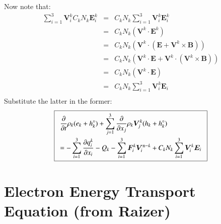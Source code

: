 \documentclass{warpdoc}
\newcommand\frameeqn[1]{\fbox{$\displaystyle #1$}}
\newcommand{\alb}{\vspace{0.1cm}\\} %
\newcommand{\mfd}{\displaystyle}
\renewcommand{\vec}[1]{\bm{#1}}
\begin{document}
%  
Now note that:
%
\begin{equation}
\begin{array}{rcl}
  \sum_{i=1}^3 \vec{V}_i^k C_k N_k \vec{E}^k_i 
     &=& C_k N_k \sum_{i=1}^3 \vec{V}_i^k \vec{E}^k_i \\
   ~ &=& C_k N_k  \left(\vec{V}^k \cdot \vec{E}^k \right) \\
   ~ &=& C_k N_k  \left(\vec{V}^k \cdot (\vec{E}+\vec{V}^k \times \vec{B}) \right)\\
   ~ &=& C_k N_k  \left(\vec{V}^k \cdot \vec{E}+ \vec{V}^k \cdot (\vec{V}^k \times \vec{B}) \right)\\
   ~ &=& C_k N_k  \left(\vec{V}^k \cdot \vec{E} \right)\\
   ~ &=& C_k N_k \sum_{i=1}^3 \vec{V}^k_i \vec{E}_i \\
\end{array}
\end{equation}
%
Substitute the latter in the former:
%
\begin{equation}
\frameeqn{
\begin{array}{l}\mfd
 \frac{\partial }{\partial t}\rho_k (e_k+h_k^\circ) + \sum_{j=1}^3  \frac{\partial }{\partial x_j} \rho_k \vec{V}^k_j (h_k+h_k^\circ) 
\alb\mfd= 
-\sum_{i=1}^{3}\frac{\partial q_i^k}{\partial x_i}
- Q_{k}
-\sum_{i=1}^3 \vec{F}_i^k \vec{V}_i^{{\rm n}-k} 
+ C_k N_k \sum_{i=1}^3 \vec{V}^k_i \vec{E}_i
\end{array}
}
\label{eqn:echarged5}
\end{equation}
%  







\section{Electron Energy Transport Equation (from Raizer)}
\end{document}

